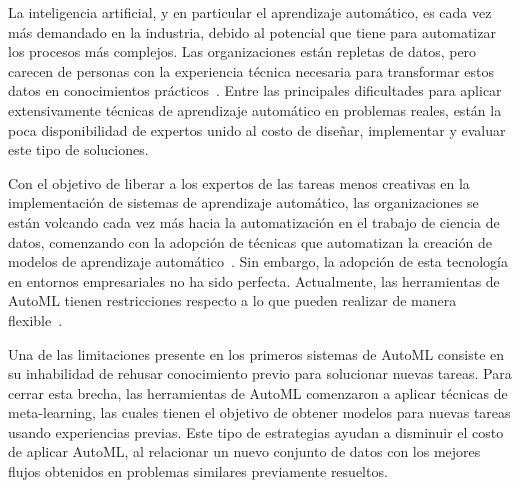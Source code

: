 \begin{conclusions}\label{conclusion}

\qquad 


La inteligencia artificial, y en particular el aprendizaje automático, es cada vez más demandado en la industria, debido al potencial que tiene para automatizar los procesos más complejos. Las organizaciones están repletas de datos, pero carecen de personas con la experiencia técnica necesaria para transformar estos datos en conocimientos prácticos~\cite{miller2017quant}. Entre las principales dificultades para aplicar extensivamente técnicas de aprendizaje automático en problemas reales, están la poca disponibilidad de expertos unido al costo de diseñar, implementar y evaluar este tipo de soluciones. 

Con el objetivo de liberar a los expertos de las tareas menos creativas en la implementación de sistemas de aprendizaje automático, las organizaciones se están volcando cada vez más hacia la automatización en el trabajo de ciencia de datos, comenzando con la adopción de técnicas que automatizan la creación de modelos de aprendizaje automático~\cite{drozdal2020trust, wang2019humanai}. Sin embargo, la adopción de esta tecnología en entornos empresariales no ha sido perfecta. Actualmente, las herramientas de AutoML tienen restricciones respecto a lo que pueden realizar de manera flexible~\cite{crisan2021fits}. %

Una de las limitaciones presente en los primeros sistemas de AutoML consiste en su inhabilidad de rehusar conocimiento previo para solucionar nuevas tareas. Para cerrar esta brecha, las herramientas de AutoML comenzaron a aplicar técnicas de meta-learning, las cuales tienen el objetivo de obtener modelos para nuevas tareas usando experiencias previas. Este tipo de estrategias ayudan a disminuir el costo de aplicar AutoML, al relacionar un nuevo conjunto de datos con los mejores flujos obtenidos en problemas similares previamente resueltos. 


\end{conclusions}
